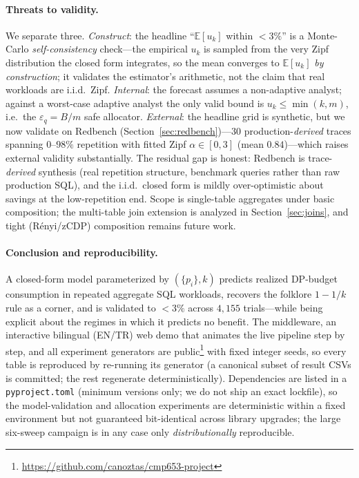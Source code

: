 \documentclass[sigconf,nonacm]{acmart}
\newcommand{\eps}{\varepsilon}
\newcommand{\E}{\mathbb{E}}
\begin{document}
\paragraph{Threats to validity.}
We separate three. \emph{Construct}: the headline ``$\E[u_k]$ within $<3\%$'' is a Monte-Carlo \emph{self-consistency} check---the empirical $u_k$ is sampled from the very Zipf distribution the closed form integrates, so the mean converges to $\E[u_k]$ \emph{by construction}; it validates the estimator's arithmetic, not the claim that real workloads are i.i.d.\ Zipf. \emph{Internal}: the forecast assumes a non-adaptive analyst; against a worst-case adaptive analyst the only valid bound is $u_k\le\min(k,m)$, i.e.\ the $\eps_q{=}B/m$ safe allocator. \emph{External}: the headline grid is synthetic, but we now validate on Redbench (Section~\ref{sec:redbench})---30 production-\emph{derived} traces spanning $0$--$98\%$ repetition with fitted Zipf $\alpha\in[0,3]$ (mean $0.84$)---which raises external validity substantially. The residual gap is honest: Redbench is trace-\emph{derived} synthesis (real repetition structure, benchmark queries rather than raw production SQL), and the i.i.d.\ closed form is mildly over-optimistic about savings at the low-repetition end. Scope is single-table aggregates under basic composition; the multi-table join extension is analyzed in Section~\ref{sec:joins}, and tight (R\'enyi/zCDP) composition remains future work.

\paragraph{Conclusion and reproducibility.}
A closed-form model parameterized by $(\{p_i\},k)$ predicts realized DP-budget consumption in repeated aggregate SQL workloads, recovers the folklore $1-1/k$ rule as a corner, and is validated to $<3\%$ across $4{,}155$ trials---while being explicit about the regimes in which it predicts no benefit. The middleware, an interactive bilingual (EN/TR) web demo that animates the live pipeline step by step, and all experiment generators are public\footnote{\url{https://github.com/canoztas/cmp653-project}} with fixed integer seeds, so every table is reproduced by re-running its generator (a canonical subset of result CSVs is committed; the rest regenerate deterministically). Dependencies are listed in a \texttt{pyproject.toml} (minimum versions only; we do not ship an exact lockfile), so the model-validation and allocation experiments are deterministic within a fixed environment but not guaranteed bit-identical across library upgrades; the large six-sweep campaign is in any case only \emph{distributionally} reproducible.
\end{document}
